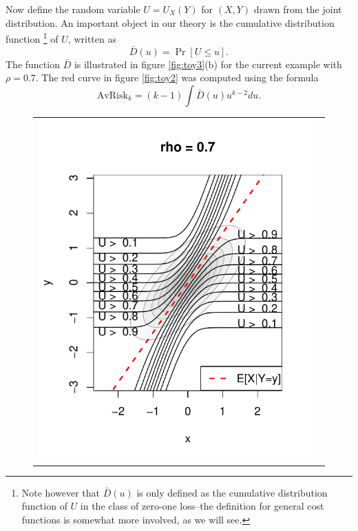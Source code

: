 \documentclass[12pt]{article}
\begin{document}
Now define the random variable $U = U_X(Y)$ for $(X, Y)$ drawn from
the joint distribution.  An important object in our theory is the
cumulative distribution function
\footnote{Note however that $\bar{D}(u)$ is only defined as the cumulative
distribution function of $U$ in the class of zero-one loss--the
definition for general cost functions is somewhat more involved, as we
will see.}
of $U$, written as
\[
\bar{D}(u) = \Pr[U \leq u].
\]
The function $\bar{D}$ is illustrated in
figure \ref{fig:toy3}(b) for the current example with $\rho = 0.7$.
The red curve in figure \ref{fig:toy2} was computed using the formula
\[
\text{AvRisk}_k = (k-1) \int \bar{D}(u) u^{k-2} du.
\]

\begin{figure}[h]
\centering
\begin{tabular}{cc}
\includegraphics[scale = 0.6, clip = true, trim = 0.1in 0 0 0.8in]{extrapolation_figures/illus_ufunc_0_7.pdf} &

\end{tabular}
\end{figure}
\end{document}
